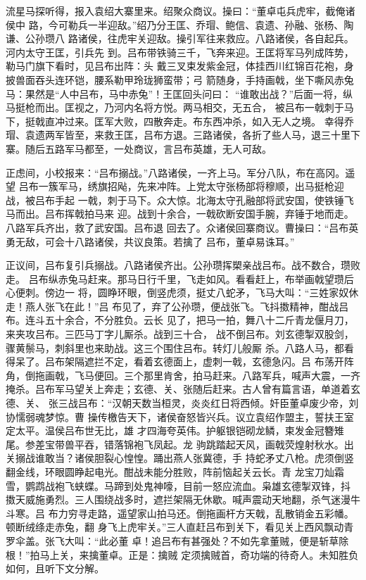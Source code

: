 流星马探听得，报入袁绍大寨里来。绍聚众商议。操曰：“董卓屯兵虎牢，截俺诸侯中
路，今可勒兵一半迎敌。”绍乃分王匡、乔瑁、鲍信、袁遗、孙融、张杨、陶谦、公孙瓒八
路诸侯，往虎牢关迎敌。操引军往来救应。八路诸侯，各自起兵。河内太守王匡，引兵先
到。吕布带铁骑三千，飞奔来迎。王匡将军马列成阵势，勒马门旗下看时，见吕布出阵：头
戴三叉束发紫金冠，体挂西川红锦百花袍，身披兽面吞头连环铠，腰系勒甲玲珑狮蛮带；弓
箭随身，手持画戟，坐下嘶风赤兔马：果然是“人中吕布，马中赤兔”！王匡回头问曰：
“谁敢出战？”后面一将，纵马挺枪而出。匡视之，乃河内名将方悦。两马相交，无五合，
被吕布一戟刺于马下，挺戟直冲过来。匡军大败，四散奔走。布东西冲杀，如入无人之境。
幸得乔瑁、袁遗两军皆至，来救王匡，吕布方退。三路诸侯，各折了些人马，退三十里下
寨。随后五路军马都至，一处商议，言吕布英雄，无人可敌。

正虑间，小校报来：“吕布搦战。”八路诸侯，一齐上马。军分八队，布在高冈。遥望
吕布一簇军马，绣旗招飐，先来冲阵。上党太守张杨部将穆顺，出马挺枪迎战，被吕布手起
一戟，刺于马下。众大惊。北海太守孔融部将武安国，使铁锤飞马而出。吕布挥戟拍马来
迎。战到十余合，一戟砍断安国手腕，弃锤于地而走。八路军兵齐出，救了武安国。吕布退
回去了。众诸侯回寨商议。曹操曰：“吕布英勇无敌，可会十八路诸侯，共议良策。若擒了
吕布，董卓易诛耳。”

正议间，吕布复引兵搦战。八路诸侯齐出。公孙瓒挥槊亲战吕布。战不数合，瓒败走。
吕布纵赤兔马赶来。那马日行千里，飞走如风。看看赶上，布举画戟望瓒后心便刺。傍边一
将，圆睁环眼，倒竖虎须，挺丈八蛇矛，飞马大叫：“三姓家奴休走！燕人张飞在此！”吕
布见了，弃了公孙瓒，便战张飞。飞抖擞精神，酣战吕布。连斗五十余合，不分胜负。云长
见了，把马一拍，舞八十二斤青龙偃月刀，来夹攻吕布。三匹马丁字儿厮杀。战到三十合，
战不倒吕布。刘玄德掣双股剑，骤黄鬃马，刺斜里也来助战。这三个围住吕布。转灯儿般厮
杀。八路人马，都看得呆了。吕布架隔遮拦不定，看着玄德面上，虚刺一戟，玄德急闪。吕
布荡开阵角，倒拖画戟，飞马便回。三个那里肯舍，拍马赶来。八路军兵，喊声大震，一齐
掩杀。吕布军马望关上奔走；玄德、关、张随后赶来。古人曾有篇言语，单道着玄德、关、
张三战吕布：“汉朝天数当桓灵，炎炎红日将西倾。奸臣董卓废少帝，刘协懦弱魂梦惊。曹
操传檄告天下，诸侯奋怒皆兴兵。议立袁绍作盟主，誓扶王室定太平。温侯吕布世无比，雄
才四海夸英伟。护躯银铠砌龙鳞，束发金冠簪雉尾。参差宝带兽平吞，错落锦袍飞凤起。龙
驹跳踏起天风，画戟荧煌射秋水。出关搦战谁敢当？诸侯胆裂心惶惶。踊出燕人张冀德，手
持蛇矛丈八枪。虎须倒竖翻金线，环眼圆睁起电光。酣战未能分胜败，阵前恼起关云长。青
龙宝刀灿霜雪，鹦鹉战袍飞蛱蝶。马蹄到处鬼神嚎，目前一怒应流血。枭雄玄德掣双锋，抖
擞天威施勇烈。三人围绕战多时，遮拦架隔无休歇。喊声震动天地翻，杀气迷漫牛斗寒。吕
布力穷寻走路，遥望家山拍马还。倒拖画杆方天戟，乱散销金五彩幡。顿断绒绦走赤兔，翻
身飞上虎牢关。”三人直赶吕布到关下，看见关上西风飘动青罗伞盖。张飞大叫：“此必董
卓！追吕布有甚强处？不如先拿董贼，便是斩草除根！”拍马上关，来擒董卓。正是：擒贼
定须擒贼首，奇功端的待奇人。未知胜负如何，且听下文分解。